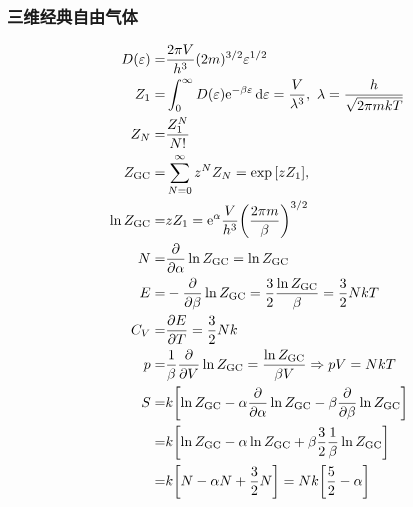 \subsubsection{三维经典自由气体}

\begin{align*}
    D(\varepsilon) =     & \frac{2 \pi V}{h^3} (2 m)^{3/2} \varepsilon^{1/2}                                                                                               \\
    Z_1 =                & \int_0^{\infty} D(\varepsilon) \mathrm{e}^{- \beta \varepsilon} \dd{\varepsilon} = \frac{V}{\lambda^3},\ \lambda = \frac{h}{\sqrt{2 \pi m k T}} \\
    Z_N =                & \frac{Z_1^N}{N!}                                                                                                                                \\
    Z_{\text{GC}} =      & \sum_{N = 0}^{\infty} z^N Z_N = \exp \qty[z Z_1],                                                                                               \\
    \ln{Z_{\text{GC}}} = & z Z_1 = \mathrm{e}^{\alpha} \frac{V}{h^3} \qty(\frac{2 \pi m}{\beta})^{3/2}                                                                     \\
    N =                  & \pdv{\alpha} \ln{Z_{\text{GC}}} = \ln{Z_{\text{GC}}}                                                                                            \\
    E =                  & - \pdv{\beta} \ln{Z_{\text{GC}}} = \frac{3}{2} \frac{\ln{Z_{\text{GC}}}}{\beta} = \frac{3}{2} N k T                                             \\
    C_V =                & \pdv{E}{T} = \frac{3}{2} N k                                                                                                                    \\
    p =                  & \frac{1}{\beta} \pdv{V} \ln{Z_{\text{GC}}} = \frac{\ln{Z_{\text{GC}}}}{\beta V} \Rightarrow p V = N k T                                         \\
    S =                  & k \qty[\ln{Z_{\text{GC}}} - \alpha \pdv{\alpha} \ln{Z_{\text{GC}}} - \beta \pdv{\beta} \ln{Z_{\text{GC}}}]                                      \\
    =                    & k \qty[\ln{Z_{\text{GC}}} - \alpha \ln{Z_{\text{GC}}} + \beta \frac{3}{2} \frac{1}{\beta} \ln{Z_{\text{GC}}}]                                   \\
    =                    & k \qty[N - \alpha N +\frac{3}{2} N] = N k \qty[\frac{5}{2} - \alpha]
\end{align*}

